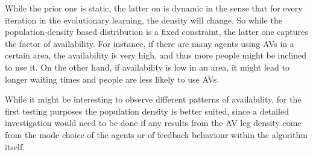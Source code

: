 While the prior one is static, the latter on is dynamic in the sense that for every
iteration in the evolutionary learning, the density will change. So while the
population-density based distribution is a fixed constraint, the latter one captures
the factor of availability. For instance, if there are many agents using AVs in a
certain area, the availability is very high, and thus more people might be inclined
to use it. On the other hand, if availability is low in an area, it might lead to
longer waiting times and people are less likely to use AVs.

While it might be interesting to observe different patterns of availability,
for the first testing purposes the population density is better suited, since a
detailed investigation would need to be done if any results from the AV leg density
come from the mode choice of the agents or of feedback behaviour within the algorithm
itself.
